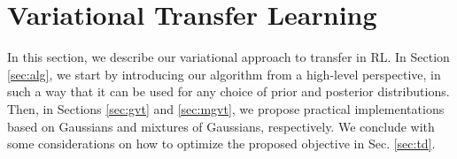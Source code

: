 \documentclass{article}
\begin{document}
%

\section{Variational Transfer Learning}

In this section, we describe our variational approach to transfer in RL. In Section \ref{sec:alg}, we start by introducing our algorithm from a high-level perspective, in such a way that it can be used for any choice of prior and posterior distributions. Then, in Sections \ref{sec:gvt} and \ref{sec:mgvt}, we propose practical implementations based on Gaussians and mixtures of Gaussians, respectively. We conclude with some considerations on how to optimize the proposed objective in Sec. \ref{sec:td}.
\end{document}
